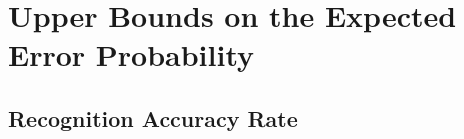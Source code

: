 \chapter{Upper Bounds on the Expected Error Probability}
\label{ch:appendix}

\section{Recognition Accuracy Rate}


